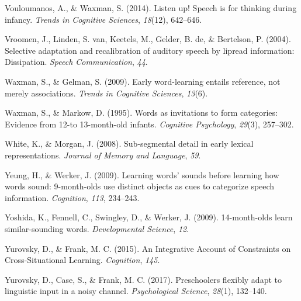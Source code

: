 \documentclass[english,,man,floatsintext]{apa6}
\theoremstyle{definition}
\theoremstyle{definition}
\theoremstyle{definition}
\theoremstyle{remark}
\begin{document}
\hypertarget{ref-vouloumanos2014}{}
Vouloumanos, A., \& Waxman, S. (2014). Listen up! Speech is for thinking
during infancy. \emph{Trends in Cognitive Sciences}, \emph{18}(12),
642--646.

\hypertarget{ref-vroomen2004}{}
Vroomen, J., Linden, S. van, Keetels, M., Gelder, B. de, \& Bertelson,
P. (2004). Selective adaptation and recalibration of auditory speech by
lipread information: Dissipation. \emph{Speech Communication},
\emph{44}.

\hypertarget{ref-waxman2009}{}
Waxman, S., \& Gelman, S. (2009). Early word-learning entails reference,
not merely associations. \emph{Trends in Cognitive Sciences},
\emph{13}(6).

\hypertarget{ref-waxman1995}{}
Waxman, S., \& Markow, D. (1995). Words as invitations to form
categories: Evidence from 12-to 13-month-old infants. \emph{Cognitive
Psychology}, \emph{29}(3), 257--302.

\hypertarget{ref-white2008b}{}
White, K., \& Morgan, J. (2008). Sub-segmental detail in early lexical
representations. \emph{Journal of Memory and Language}, \emph{59}.

\hypertarget{ref-yeung09}{}
Yeung, H., \& Werker, J. (2009). Learning words' sounds before learning
how words sound: 9-month-olds use distinct objects as cues to categorize
speech information. \emph{Cognition}, \emph{113}, 234--243.

\hypertarget{ref-yoshida2009}{}
Yoshida, K., Fennell, C., Swingley, D., \& Werker, J. (2009).
14-month-olds learn similar-sounding words. \emph{Developmental
Science}, \emph{12}.

\hypertarget{ref-yurovsky2015}{}
Yurovsky, D., \& Frank, M. C. (2015). An Integrative Account of
Constraints on Cross-Situational Learning. \emph{Cognition}, \emph{145}.

\hypertarget{ref-yurovsky2017}{}
Yurovsky, D., Case, S., \& Frank, M. C. (2017). Preschoolers flexibly
adapt to linguistic input in a noisy channel. \emph{Psychological
Science}, \emph{28}(1), 132--140.
\end{document}
